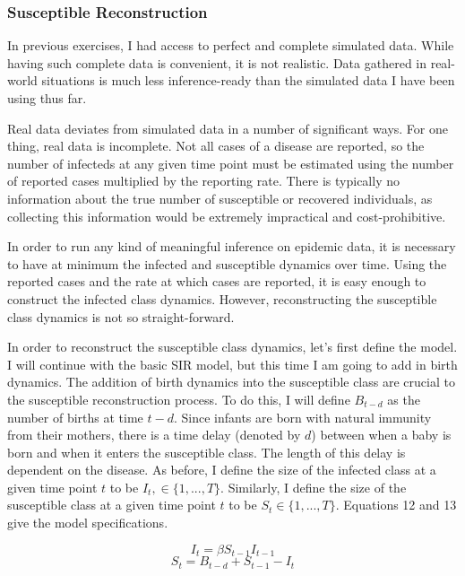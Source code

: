 \documentclass{article}
\begin{document}
\subsubsection{Susceptible Reconstruction}
In previous exercises, I had access to perfect and complete simulated data. While having such complete data is convenient, it is not realistic. Data gathered in real-world situations is much less inference-ready than the simulated data I have been using thus far.

Real data deviates from simulated data in a number of significant ways. For one thing, real data is incomplete. Not all cases of a disease are reported, so the number of infecteds at any given time point must be estimated using the number of reported cases multiplied by the reporting rate. There is typically no information about the true number of susceptible or recovered individuals, as collecting this information would be extremely impractical and cost-prohibitive. 

In order to run any kind of meaningful inference on epidemic data, it is necessary to have at minimum the infected and susceptible dynamics over time. Using the reported cases and the rate at which cases are reported, it is easy enough to construct the infected class dynamics. However, reconstructing the susceptible class dynamics is not so straight-forward. 

In order to reconstruct the susceptible class dynamics, let's first define the model. I will continue with the basic SIR model, but this time I am going to add in birth dynamics. The addition of birth dynamics into the susceptible class are crucial to the susceptible reconstruction process. To do this, I will define $B_{t-d}$ as the number of births at time $t-d$. Since infants are born with natural immunity from their mothers, there is a time delay (denoted by $d$) between when a baby is born and when it enters the susceptible class. The length of this delay is dependent on the disease. As before, I define the size of the infected class at a given time point $t$ to be $I_{t}, \in{\{1,...,T\}}$. Similarly, I define the size of the susceptible class at a given time point $t$ to be $S_{t} \in{\{1,...,T\}}$. Equations 12 and 13 give the model specifications. 

\begin{equation}
I_{t} = \beta S_{t-1} I_{t-1}
\end{equation}
\begin{equation}
S_{t} = B_{t-d} + S_{t-1} - I_{t}
\end{equation}
\end{document}
